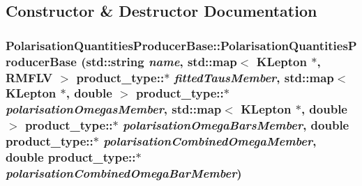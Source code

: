 \subsection{Constructor \& Destructor Documentation}
\hypertarget{classPolarisationQuantitiesProducerBase_a2d1b02c1ddccb2f2e115fd19fd05217b}{
\subsubsection[{PolarisationQuantitiesProducerBase}]{\setlength{\rightskip}{0pt plus 5cm}PolarisationQuantitiesProducerBase::PolarisationQuantitiesProducerBase (std::string {\em name}, \/  std::map$<$ KLepton $\ast$, RMFLV $>$ product\_\-type::$\ast$ {\em fittedTausMember}, \/  std::map$<$ KLepton $\ast$, double $>$ product\_\-type::$\ast$ {\em polarisationOmegasMember}, \/  std::map$<$ KLepton $\ast$, double $>$ product\_\-type::$\ast$ {\em polarisationOmegaBarsMember}, \/  double product\_\-type::$\ast$ {\em polarisationCombinedOmegaMember}, \/  double product\_\-type::$\ast$ {\em polarisationCombinedOmegaBarMember})}}
\label{classPolarisationQuantitiesProducerBase_a2d1b02c1ddccb2f2e115fd19fd05217b}


